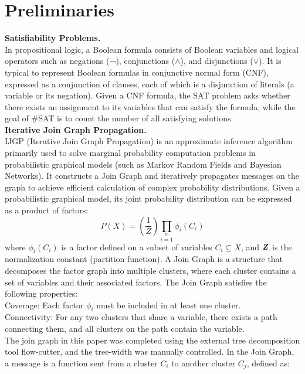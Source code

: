 \section{Preliminaries}
\textbf{Satisfiability Problems.\\} 
In propositional logic, a Boolean formula consists of Boolean variables and logical operators such as negations (¬), conjunctions ($ \land $), and disjunctions ($\lor$). It is typical to represent Boolean formulas in conjunctive normal form (CNF), expressed as a conjunction of clauses, each of which is a disjunction of literals (a variable or its negation). Given a CNF formula, the SAT problem asks whether there exists an assignment to its variables that can satisfy the formula, while the goal of \#SAT is to count the number of all satisfying solutions.\\
\textbf{Iterative Join Graph Propagation.\\}
IJGP (Iterative Join Graph Propagation) is an approximate inference algorithm primarily used to solve marginal probability computation problems in probabilistic graphical models (such as Markov Random Fields and Bayesian Networks). It constructs a Join Graph and iteratively propagates messages on the graph to achieve efficient calculation of complex probability distributions.
Given a probabilistic graphical model, its joint probability distribution can be expressed as a product of factors:
\begin{equation}
P(X)=\left(\frac{1}{Z}\right)\prod\limits_{i=1}\limits^m\phi_i(C_i)
\end{equation}
where \(\phi_i(C_i)\) is a factor defined on a subset of variables \(C_i\subseteq X\), and
\(\textbf{\textit{Z}}\) is the normalization constant (partition function).
A Join Graph is a structure that decomposes the factor graph into multiple clusters, where each cluster contains a set of variables and their associated factors. The Join Graph satisfies the following properties:\\
Coverage: Each factor \(\phi_i\) must be included in at least one cluster.\\
Connectivity: For any two clusters that share a variable, there exists a path connecting them, and all clusters on the path contain the variable.\\
The join graph in this paper was completed using the external tree decomposition tool flow-cutter, and the tree-width was manually controlled.
In the Join Graph, a message is a function sent from a cluster \(C_i\) to another cluster \(C_j\), defined as:
